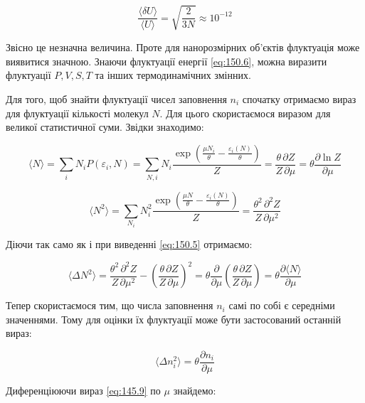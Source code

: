 \begin{equation}
	\frac{\langle \delta U \rangle}{\langle U \rangle} = \sqrt{\frac{2}{3N}} \approx 10^{-12}
	\label{eq:150.7}
\end{equation}

Звісно це незначна величина. Проте для нанорозмірних об’єктів флуктуація може виявитися значною. Знаючи флуктуації енергії \eqref{eq:150.6}, можна виразити флуктуації $P, V, S, T$ та інших термодинамічних змінних.

Для того, щоб знайти флуктуації чисел заповнення $n_i$ спочатку отримаємо вираз для флуктуації кількості молекул $N$. Для цього скористаємося виразом для великої статистичної суми. Звідки знаходимо:

\begin{equation}
	\langle N \rangle = \sum_i N_i P(\varepsilon_i, N) = \sum_{N,i} N_i \frac{\exp\left( \frac{\mu N_i}{\theta} - \frac{\varepsilon_i (N)}{\theta} \right)}{Z} = \frac{\theta \, \partial Z}{Z \, \partial \mu} = \theta \frac{\partial \ln Z}{\partial \mu}
	\label{eq:150.8}
\end{equation}

\begin{equation}
	\langle N^2 \rangle = \sum_{N_i} N_i^2 \frac{\exp\left( \frac{\mu N}{\theta} - \frac{\varepsilon_i (N)}{\theta} \right)}{Z} = \frac{\theta^2 \, \partial^2 Z}{Z \, \partial \mu^2}
	\label{eq:150.9}
\end{equation}

Діючи так само як і при виведенні \eqref{eq:150.5} отримаємо:

\begin{equation}
	\langle \Delta N^2 \rangle = \frac{\theta^2 \, \partial^2 Z}{Z \, \partial \mu^2} - \left( \frac{\theta \, \partial Z}{Z \, \partial \mu} \right)^2 = \theta \frac{\partial}{\partial \mu} \left( \frac{\theta \, \partial Z}{Z \, \partial \mu} \right) = \theta \frac{\partial \langle N \rangle}{\partial \mu}
	\label{eq:150.10}
\end{equation}

Тепер скористаємося тим, що числа заповнення $n_i$ самі по собі є середніми значеннями. Тому для оцінки їх флуктуації може бути застосований останній вираз:

\begin{equation}
	\langle \Delta n_i^2 \rangle = \theta \frac{\partial n_i}{\partial \mu}
	\label{eq:150.11}
\end{equation}

Диференціюючи вираз \eqref{eq:145.9} по $\mu$ знайдемо:

